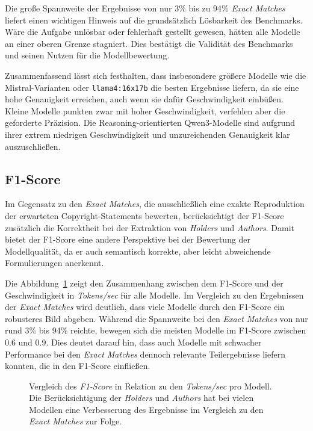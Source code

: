 Die große Spannweite der Ergebnisse von nur \num{3}\% bis zu \num{94}\% \textit{Exact Matches} liefert einen wichtigen Hinweis auf die grundsätzlich Lösbarkeit des Benchmarks.
Wäre die Aufgabe unlösbar oder fehlerhaft gestellt gewesen, hätten alle Modelle an einer oberen Grenze stagniert.
Dies bestätigt die Validität des Benchmarks und seinen Nutzen für die Modellbewertung.

Zusammenfassend lässt sich festhalten, dass insbesondere größere Modelle wie die Mistral-Varianten oder \texttt{llama4:16x17b} die besten Ergebnisse liefern, da sie eine hohe Genauigkeit erreichen, auch wenn sie dafür Geschwindigkeit einbüßen.
Kleine Modelle punkten zwar mit hoher Geschwindigkeit, verfehlen aber die geforderte Präzision.
Die Reasoning-orientierten Qwen3-Modelle sind aufgrund ihrer extrem niedrigen Geschwindigkeit und unzureichenden Genauigkeit klar auszuschließen.


\subsection{F1-Score}

Im Gegensatz zu den \textit{Exact Matches}, die ausschließlich eine exakte Reproduktion der erwarteten Copyright-Statements bewerten, berücksichtigt der F1-Score zusätzlich die Korrektheit bei der Extraktion von \textit{Holders} und \textit{Authors}.
Damit bietet der F1-Score eine andere Perspektive bei der Bewertung der Modellqualität, da er auch semantisch korrekte, aber leicht abweichende Formulierungen anerkennt.

Die Abbildung~\ref{fig:f1-overall-result} zeigt den Zusammenhang zwischen dem F1-Score und der Geschwindigkeit in \textit{Tokens/sec} für alle Modelle.
Im Vergleich zu den Ergebnissen der \textit{Exact Matches} wird deutlich, dass viele Modelle durch den F1-Score ein robusteres Bild abgeben.
Während die Spannweite bei den \textit{Exact Matches} von nur rund \num{3}\% bis \num{94}\% reichte, bewegen sich die meisten Modelle im F1-Score zwischen \num{0.6} und \num{0.9}.
Dies deutet darauf hin, dass auch Modelle mit schwacher Performance bei den \textit{Exact Matches} dennoch relevante Teilergebnisse liefern konnten, die in den F1-Score einfließen.

\begin{figure}[ht]
    \centering
    \caption{Vergleich des \textit{F1-Score} in Relation zu den \textit{Tokens/sec} pro Modell. Die Berücksichtigung der \textit{Holders} und \textit{Authors} hat bei vielen Modellen eine Verbesserung des Ergebnisse im Vergleich zu den \textit{Exact Matches} zur Folge.}
    \label{fig:f1-overall-result}
\end{figure}

